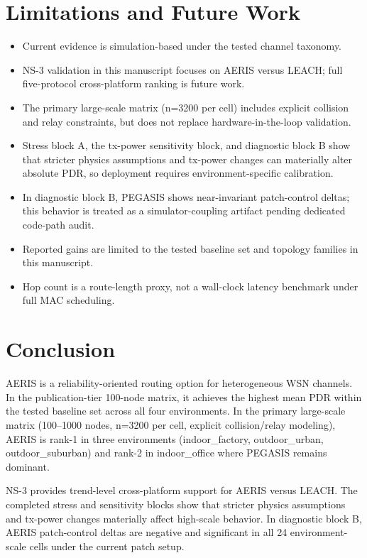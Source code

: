﻿\documentclass[sensors,article,submit,moreauthors,pdftex]{Definitions/mdpi}
\begin{document}
\section{Limitations and Future Work}
\begin{itemize}
\item Current evidence is simulation-based under the tested channel taxonomy.
\item NS-3 validation in this manuscript focuses on AERIS versus LEACH; full five-protocol cross-platform ranking is future work.
\item The primary large-scale matrix (n=3200 per cell) includes explicit collision and relay constraints, but does not replace hardware-in-the-loop validation.
\item Stress block A, the tx-power sensitivity block, and diagnostic block B show that stricter physics assumptions and tx-power changes can materially alter absolute PDR, so deployment requires environment-specific calibration.
\item In diagnostic block B, PEGASIS shows near-invariant patch-control deltas; this behavior is treated as a simulator-coupling artifact pending dedicated code-path audit.
\item Reported gains are limited to the tested baseline set and topology families in this manuscript.
\item Hop count is a route-length proxy, not a wall-clock latency benchmark under full MAC scheduling.
\end{itemize}

\section{Conclusion}
AERIS is a reliability-oriented routing option for heterogeneous WSN channels. In the publication-tier 100-node matrix, it achieves the highest mean PDR within the tested baseline set across all four environments. In the primary large-scale matrix (100--1000 nodes, n=3200 per cell, explicit collision/relay modeling), AERIS is rank-1 in three environments (indoor\_factory, outdoor\_urban, outdoor\_suburban) and rank-2 in indoor\_office where PEGASIS remains dominant.

NS-3 provides trend-level cross-platform support for AERIS versus LEACH. The completed stress and sensitivity blocks show that stricter physics assumptions and tx-power changes materially affect high-scale behavior. In diagnostic block B, AERIS patch-control deltas are negative and significant in all 24 environment-scale cells under the current patch setup.
\end{document}
